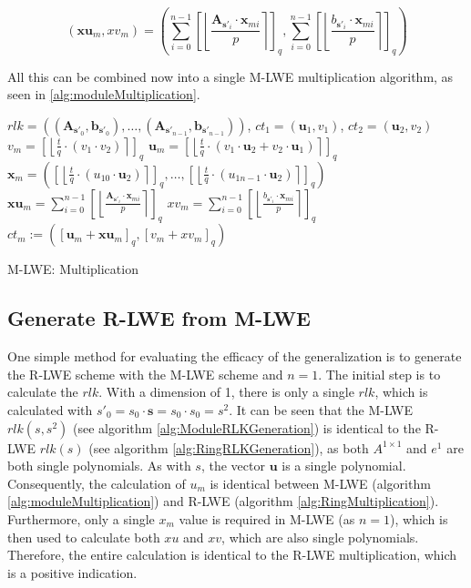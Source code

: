 \begin{equation}
  (\textbf{xu}_m, xv_m) = \left(\sum_{i=0}^{n-1}\left[\left\lfloor\frac{\textbf{A}_{\textbf{s}'_i} \cdot \textbf{x}_{mi}}{p}  \right\rceil \right]_q, \sum_{i=0}^{n-1}\left[\left\lfloor \frac{b_{\textbf{s}'_i} \cdot \textbf{x}_{mi}}{p}  \right\rceil \right]_q\right)
  \label{eq:moduleXmSplitting}
\end{equation}

All this can be combined now into a single M-LWE multiplication algorithm, as seen in \ref{alg:moduleMultiplication}.

\begin{algorithm}[htb]
  \begin{algorithmic}[1]
    \REQUIRE $rlk=((\textbf{A}_{\textbf{s}'_0}, \textbf{b}_{\textbf{s}'_0}), \ldots ,(\textbf{A}_{\textbf{s}'_{n-1}}, \textbf{b}_{\textbf{s}'_{n-1}}))$, $ct_1 = (\textbf{u}_1, v_1)$, $ct_2 = (\textbf{u}_2, v_2)$
    \STATE $v_m = \left[\left\lfloor \frac{t}{q}\cdot (v_1 \cdot v_2)\right\rceil\right] _q $
    \STATE $\textbf{u}_m = \left[\left\lfloor \frac{t}{q}\cdot(v_1 \cdot \textbf{u}_2 + v_2 \cdot \textbf{u}_1)\right\rceil\right] _q$
    \STATE $\textbf{x}_m = \left(\left[\left\lfloor \frac{t}{q}\cdot(u_{10} \cdot \textbf{u}_2)\right\rceil\right]_q,\ldots, \left[\left\lfloor \frac{t}{q}\cdot(u_{1n-1} \cdot \textbf{u}_2)\right\rceil\right]_q\right) $
    \STATE $\textbf{xu}_m = \sum_{i=0}^{n-1}\left[\left\lfloor\frac{\textbf{A}_{\textbf{s}'_i} \cdot \textbf{x}_{mi}}{p}  \right\rceil \right]_q$
    \STATE $xv_m = \sum_{i=0}^{n-1}\left[\left\lfloor \frac{b_{\textbf{s}'_i} \cdot \textbf{x}_{mi}}{p}  \right\rceil \right]_q$
    \RETURN $ct_m:=(\left[\textbf{u}_m + \textbf{xu}_m\right]_q , \left[v_m + xv_m\right]_q )$
  \end{algorithmic}
  \caption{M-LWE: Multiplication}
  \label{alg:moduleMultiplication}
\end{algorithm}

\subsection*{Generate R-LWE from M-LWE}

One simple method for evaluating the efficacy of the generalization is to generate the R-LWE scheme with the M-LWE scheme and $n=1$. The initial step is to calculate the $rlk$. With a dimension of 1, there is only a single $rlk$, which is calculated with $s'_0 = s_0 \cdot \textbf{s} = s_0 \cdot s_0 = s^2$. It can be seen that the M-LWE $rlk(s, s^2)$ (see algorithm \ref{alg:ModuleRLKGeneration}) is identical to the R-LWE $rlk(s)$ (see algorithm \ref{alg:RingRLKGeneration}), as both $A^{1 \times 1}$ and $e^1$ are both single polynomials. As with $s$, the vector $\textbf{u}$ is a single polynomial. Consequently, the calculation of $u_m$ is identical between M-LWE (algorithm \ref{alg:moduleMultiplication}) and R-LWE (algorithm \ref{alg:RingMultiplication}). Furthermore, only a single $x_m$ value is required in M-LWE (as $n=1$), which is then used to calculate both $xu$ and $xv$, which are also single polynomials. Therefore, the entire calculation is identical to the R-LWE multiplication, which is a positive indication.
